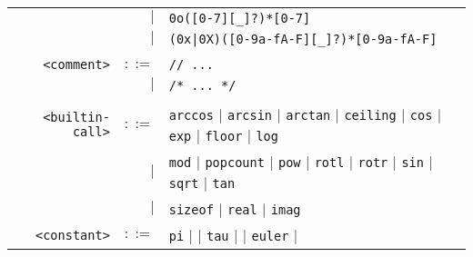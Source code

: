 \documentclass[notitlepage]{article}
\begin{document}
\begin{longtable}{rrl}
	    & $\mid$ & \texttt{0o([0-7][\_]?)*[0-7]} \\
	    & $\mid$ & \texttt{(0x|0X)([0-9a-fA-F][\_]?)*[0-9a-fA-F]} \\ \\
	\texttt{<comment>} & $::=$ & \texttt{// ...} \\
	    & $\mid$ & \texttt{/* ... */} \\ \\
	\texttt{<builtin-call>} & $::=$ & \texttt{arccos} $\mid$ \texttt{arcsin} $\mid$ \texttt{arctan} $\mid$ \texttt{ceiling} $\mid$ \texttt{cos} $\mid$ \texttt{exp} $\mid$ \texttt{floor} $\mid$ \texttt{log} \\
	    & $\mid$ & \texttt{mod} $\mid$ \texttt{popcount} $\mid$ \texttt{pow} $\mid$ \texttt{rotl} $\mid$ \texttt{rotr} $\mid$ \texttt{sin} $\mid$ \texttt{sqrt} $\mid$ \texttt{tan} \\
	    & $\mid$ & \texttt{sizeof} $\mid$ \texttt{real} $\mid$ \texttt{imag} \\
	\texttt{<constant>} & $::=$ & \texttt{pi} $\mid$ \texttt{\textpi} $\mid$ \texttt{tau} $\mid$ \texttt{\texttau} $\mid$ \texttt{euler} $\mid$ \texttt{\textepsilon} \\
\end{longtable}
\end{document}
